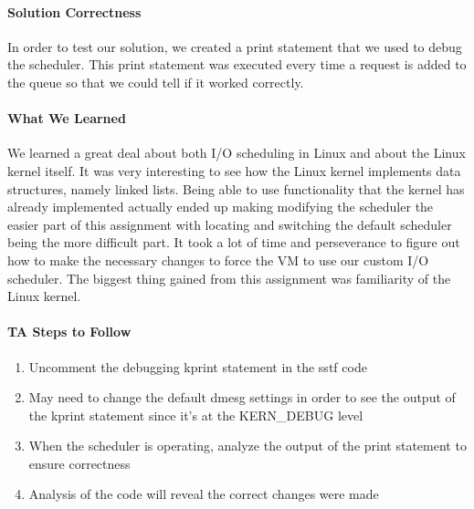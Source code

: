 \documentclass[titlepage,draftclsnofoot,onecolumn]{article}
\begin{document}
\paragraph{Solution Correctness}
In order to test our solution, we created a print statement that we used to debug the scheduler. This print statement was executed every time a request is added to the queue so that we could tell if it worked correctly. 

\paragraph{What We Learned}
We learned a great deal about both I/O scheduling in Linux and about the Linux kernel itself. It was very interesting to see how the Linux kernel implements data structures, namely linked lists. Being able to use functionality that the kernel has already implemented actually ended up making modifying the scheduler the easier part of this assignment with locating and switching the default scheduler being the more difficult part. It took a lot of time and perseverance to figure out how to make the necessary changes to force the VM to use our custom I/O scheduler. The biggest thing gained from this assignment was familiarity of the Linux kernel.
\paragraph{TA Steps to Follow}

\begin{enumerate}
  \item Uncomment the debugging kprint statement in the sstf code
  \item May need to change the default dmesg settings in order to see the output of the kprint statement since it's at the KERN\_DEBUG level
  \item When the scheduler is operating, analyze the output of the print statement to ensure correctness
  \item Analysis of the code will reveal the correct changes were made
\end{enumerate}
\end{document}
